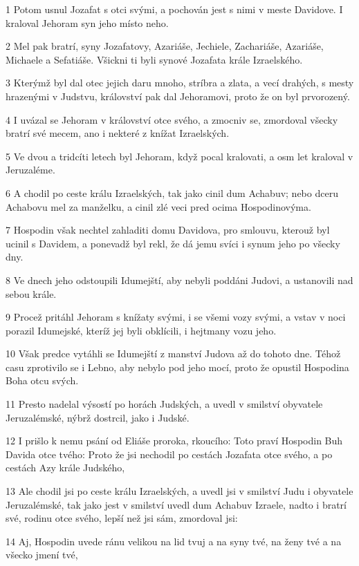 \par 1 Potom usnul Jozafat s otci svými, a pochován jest s nimi v meste Davidove. I kraloval Jehoram syn jeho místo neho.
\par 2 Mel pak bratrí, syny Jozafatovy, Azariáše, Jechiele, Zachariáše, Azariáše, Michaele a Sefatiáše. Všickni ti byli synové Jozafata krále Izraelského.
\par 3 Kterýmž byl dal otec jejich daru mnoho, stríbra a zlata, a vecí drahých, s mesty hrazenými v Judstvu, království pak dal Jehoramovi, proto že on byl prvorozený.
\par 4 I uvázal se Jehoram v království otce svého, a zmocniv se, zmordoval všecky bratrí své mecem, ano i nekteré z knížat Izraelských.
\par 5 Ve dvou a tridcíti letech byl Jehoram, když pocal kralovati, a osm let kraloval v Jeruzaléme.
\par 6 A chodil po ceste králu Izraelských, tak jako cinil dum Achabuv; nebo dceru Achabovu mel za manželku, a cinil zlé veci pred ocima Hospodinovýma.
\par 7 Hospodin však nechtel zahladiti domu Davidova, pro smlouvu, kterouž byl ucinil s Davidem, a ponevadž byl rekl, že dá jemu svíci i synum jeho po všecky dny.
\par 8 Ve dnech jeho odstoupili Idumejští, aby nebyli poddáni Judovi, a ustanovili nad sebou krále.
\par 9 Procež pritáhl Jehoram s knížaty svými, i se všemi vozy svými, a vstav v noci porazil Idumejské, kteríž jej byli obklícili, i hejtmany vozu jeho.
\par 10 Však predce vytáhli se Idumejští z manství Judova až do tohoto dne. Téhož casu zprotivilo se i Lebno, aby nebylo pod jeho mocí, proto že opustil Hospodina Boha otcu svých.
\par 11 Presto nadelal výsostí po horách Judských, a uvedl v smilství obyvatele Jeruzalémské, nýbrž dostrcil, jako i Judské.
\par 12 I prišlo k nemu psání od Eliáše proroka, rkoucího: Toto praví Hospodin Buh Davida otce tvého: Proto že jsi nechodil po cestách Jozafata otce svého, a po cestách Azy krále Judského,
\par 13 Ale chodil jsi po ceste králu Izraelských, a uvedl jsi v smilství Judu i obyvatele Jeruzalémské, tak jako jest v smilství uvedl dum Achabuv Izraele, nadto i bratrí své, rodinu otce svého, lepší než jsi sám, zmordoval jsi:
\par 14 Aj, Hospodin uvede ránu velikou na lid tvuj a na syny tvé, na ženy tvé a na všecko jmení tvé,
